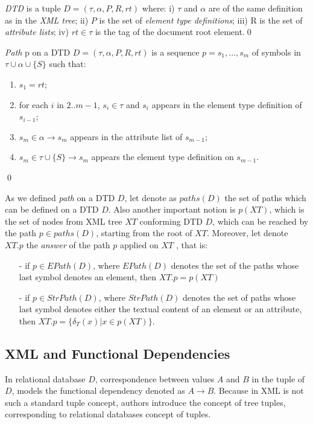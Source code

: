 \begin{define}[DTD]
{\sl DTD} is a tuple $D = (\tau, \alpha, P, R, rt)$ where: i) $\tau$ and $\alpha$ are of the same definition as in the \emph{XML tree}; ii) $P$ is the set of \emph{element type definitions}; iii) R is the set of \emph{attribute lists}; iv) $rt \in \tau$ is the tag of the document root element.\qed
\end{define}

\begin{define}[Path]
{\sl Path} p on a DTD $D = (\tau, \alpha, P, R, rt)$ is a sequence $p = s_1, \dots, s_m$ of symbols in $\tau \cup \alpha \cup \{S\}$ such that:
	\begin{enumerate}
		\item $s_1=rt$;
		\item for each $i$ in $2..m-1$, $s_i \in \tau$ and $s_i$ appears in the element type definition of $s_{i-1}$;
		\item $s_m \in \alpha \rightarrow s_m$ appears in the attribute list of $s_{m-1}$;
		\item $s_m \in \tau \cup \{S\} \rightarrow s_m$ appears the element type definition on $s_{m-1}$.
	\end{enumerate}\qed
\end{define}

As we defined \emph{path} on a DTD $D$, let denote as $paths(D)$ the set of paths which can be defined on a DTD $D$. Also another important notion is $p(XT)$, which is the set of nodes from XML tree $XT$ conforming DTD $D$, which can be reached by the path $p \in paths(D)$, starting from the root of $XT$. Moreover, let denote $XT.p$ the \emph{answer} of the path $p$ applied on $XT$ , that is:
\begin{itemize}
	\item[-] if $p \in EPath(D)$, where $EPath(D)$ denotes the set of the paths whose last symbol denotes an element, then $XT.p = p(XT)$
	\item[-] if $p \in StrPath(D)$, where $StrPath(D)$ denotes the set of paths whose last symbol denotes either the textual content of an element or an
attribute, then $XT.p = \{\delta_T(x)|x \in p(XT)\}$.
\end{itemize}

\subsection{XML and Functional Dependencies}

In relational database $D$, correspondence between values $A$ and $B$ in the tuple of $D$, models the functional dependency denoted as $A \rightarrow B$. Because in XML is not such a standard tuple concept, authors introduce the concept of tree tuples, corresponding to relational databases concept of tuples.

